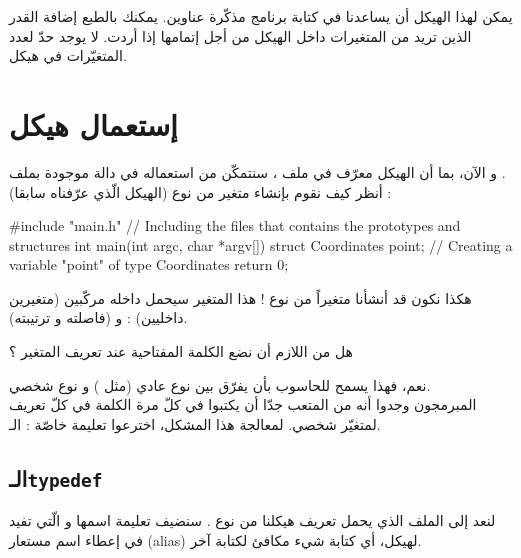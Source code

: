 يمكن لهذا الهيكل أن يساعدنا في كتابة برنامج مذكّرة عناوين. يمكنك بالطبع إضافة القدر الذين تريد من المتغيرات داخل الهيكل من أجل إتمامها إذا أردت. لا يوجد حدّ لعدد المتغيّرات في هيكل.

\section{إستعمال هيكل}
و الآن، بما أن الهيكل معرّف في ملف
،
سنتمكّن من استعماله في دالة موجودة بملف
.\\
أنظر كيف نقوم بإنشاء متغير من نوع
(الهيكل الّذي عرّفناه سابقا) :
\begin{Csource}
#include "main.h" // Including the files that contains the prototypes and structures
int main(int argc, char *argv[])
{
	struct Coordinates point; // Creating a variable "point" of type Coordinates
	return 0;
}
\end{Csource}
هكذا نكون قد أنشأنا متغيراً
من نوع
 !
هذا المتغير سيحمل داخله مركّبين (متغيرين داخليين) :
و
(فاصلته و ترتيبته).

\begin{question}
  هل من اللازم أن نضع الكلمة المفتاحية
عند تعريف المتغير ؟
\end{question}

نعم، فهذا يسمح للحاسوب بأن يفرّق بين نوع عادي (مثل
)
و نوع شخصي.\\
المبرمجون وجدوا أنه من المتعب جدّا أن يكتبوا في كلّ مرة الكلمة
في كلّ تعريف لمتغيّر شخصي.
لمعالجة هذا المشكل، اخترعوا تعليمة خاصّة : الـ.

\subsection{الـ\texttt{typedef}}
لنعد إلى الملف
الذي يحمل تعريف هيكلنا من نوع
.
سنضيف تعليمة اسمها
و الّتي تفيد في إعطاء اسم مستعار
(\textenglish{alias})
لهيكل، أي كتابة شيء مكافئ لكتابة آخر.

